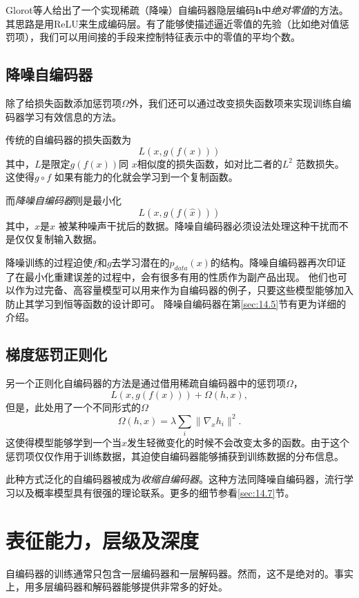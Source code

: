 Glorot等人给出了一个实现稀疏（降噪）自编码器隐层编码$\bm{h}$中\emph{绝对零值}的方法。其思路是用ReLU来生成编码层。有了能够使描述逼近零值的先验（比如绝对值惩罚项），我们可以用间接的手段来控制特征表示中的零值的平均个数。

\subsection{降噪自编码器}
除了给损失函数添加惩罚项$\Omega$外，我们还可以通过改变损失函数项来实现训练自编码器学习有效信息的方法。

传统的自编码器的损失函数为
\begin{equation}
L(x,g(f(x)))
\end{equation}
其中，$L$是限定$g(f(x))$同 $x$相似度的损失函数，如对比二者的$L^2$ 范数损失。这使得$g\circ f$ 如果有能力的化就会学习到一个复制函数。

而\emph{降噪自编码器}则是最小化
\begin{equation}
L(x,g(f(\hat{x})))
\end{equation}
其中，$\hat{x}$是$x$ 被某种噪声干扰后的数据。降噪自编码器必须设法处理这种干扰而不是仅仅复制输入数据。

降噪训练的过程迫使$f$和$g$去学习潜在的$p_{data}(x)$的结构。降噪自编码器再次印证了在最小化重建误差的过程中，会有很多有用的性质作为副产品出现。
他们也可以作为过完备、高容量模型可以用来作为自编码器的例子，只要这些模型能够加入防止其学习到恒等函数的设计即可。      
降噪自编码器在第\ref{sec:14.5}节有更为详细的介绍。

\subsection{梯度惩罚正则化}
另一个正则化自编码器的方法是通过借用稀疏自编码器中的惩罚项$\Omega$， 
\begin{equation}
L(x,g(f(x))) + \Omega(h,x),
\end{equation}
但是，此处用了一个不同形式的$\Omega$
\begin{equation}
\Omega(h,x) = \lambda \sum_i \| \nabla_x h_i\|^2.
\end{equation}
这使得模型能够学到一个当$x$发生轻微变化的时候不会改变太多的函数。由于这个惩罚项仅仅作用于训练数据，其迫使自编码器能够捕获到训练数据的分布信息。

此种方式泛化的自编码器被成为\emph{收缩自编码器}。这种方法同降噪自编码器，流行学习以及概率模型具有很强的理论联系。更多的细节参看\ref{sec:14.7}节。

\section{表征能力，层级及深度}
\label{sec:14.3}
自编码器的训练通常只包含一层编码器和一层解码器。然而，这不是绝对的。事实上，用多层编码器和解码器能够提供非常多的好处。

